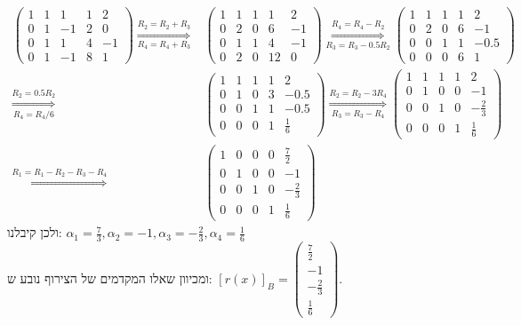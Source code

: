 \documentclass{article}
\begin{document}
	\begin{align*}
		\left( \begin{array}{cccc|c}
			1 & 1 & 1 & 1 & 2 \\
			0 & 1 & -1 & 2 & 0 \\
			0 & 1 & 1 & 4 & -1 \\
			0 & 1 & -1 & 8 & 1
		\end{array} \right) \overset{R_2 = R_2 + R_3}{\underset{R_4 = R_4 + R_3}\Rightarrow}
		&\left( \begin{array}{cccc|c}
			1 & 1 & 1 & 1 & 2 \\
			0 & 2 & 0 & 6 & -1 \\
			0 & 1 & 1 & 4 & -1 \\
			0 & 2 & 0 & 12 & 0
		\end{array} \right) \overset{R_4 = R_4 - R_2}{\underset{R_3 = R_3 - 0.5R_2}\Rightarrow}
		\left( \begin{array}{cccc|c}
			1 & 1 & 1 & 1 & 2 \\
			0 & 2 & 0 & 6 & -1 \\
			0 & 0 & 1 & 1 & -0.5 \\
			0 & 0 & 0 & 6 & 1
		\end{array} \right) \\ \overset{R_2 = 0.5R_2}{\underset{R_4 = R_4/6}\Rightarrow}
		&\left( \begin{array}{cccc|c}
			1 & 1 & 1 & 1 & 2 \\
			0 & 1 & 0 & 3 & -0.5 \\
			0 & 0 & 1 & 1 & -0.5 \\
			0 & 0 & 0 & 1 & \frac{1}{6}
		\end{array} \right) \overset{R_2 = R_2 - 3R_4}{\underset{R_3 = R_3 - R_4}\Rightarrow}
		\left( \begin{array}{cccc|c}
			1 & 1 & 1 & 1 & 2 \\
			0 & 1 & 0 & 0 & -1 \\
			0 & 0 & 1 & 0 & -\frac{2}{3} \\
			0 & 0 & 0 & 1 & \frac{1}{6}
		\end{array} \right) \\ \overset{R_1 = R_1 - R_2 - R_3 - R_4}{\Rightarrow}
		&\left( \begin{array}{cccc|c}
			1 & 0 & 0 & 0 & \frac{7}{2} \\
			0 & 1 & 0 & 0 & -1 \\
			0 & 0 & 1 & 0 & -\frac{2}{3} \\
			0 & 0 & 0 & 1 & \frac{1}{6}
		\end{array} \right)
	\end{align*}
	ולכן קיבלנו: $\alpha_1 = \frac{7}{3}, \alpha_2 = -1, \alpha_3 = -\frac{2}{3}, \alpha_4 = \frac{1}{6}$ \\
	ומכיוון שאלו המקדמים של הצירוף נובע ש: $[r(x)]_B = \begin{pmatrix}
		\frac{7}{2} \\
		-1 \\
		 -\frac{2}{3} \\
		 \frac{1}{6}
	\end{pmatrix}$.
\end{document}

